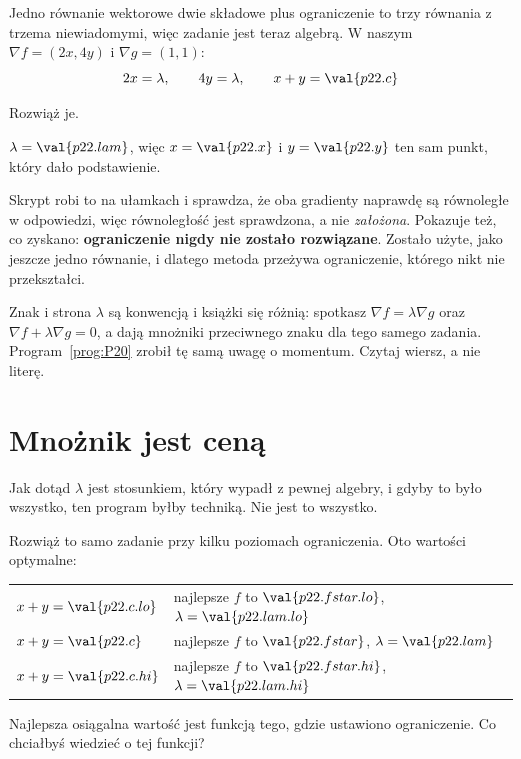 \begin{fr}
Jedno równanie wektorowe \dash{} dwie składowe \dash{} plus ograniczenie to trzy
równania z trzema niewiadomymi, więc zadanie jest teraz algebrą. W naszym
$\nabla f = (2x, 4y)$ i
$\nabla g = (1, 1)$:
\[ 2x = \lambda, \qquad 4y = \lambda, \qquad x + y = \val{p22.c} \]

Rozwiąż je.
\nextframe
\end{fr}

\begin{fr}
\begin{ansblock}
$\lambda = \val{p22.lam}$, więc $x = \val{p22.x}$ i $y = \val{p22.y}$ \dash{}
ten sam punkt, który dało podstawienie.
\end{ansblock}

Skrypt robi to na ułamkach i sprawdza, że oba gradienty naprawdę są równoległe w
odpowiedzi, więc równoległość jest sprawdzona, a nie \emph{założona}. Pokazuje
też, co zyskano: \textbf{ograniczenie nigdy nie zostało
rozwiązane}. Zostało użyte, jako jeszcze jedno równanie, i dlatego metoda
przeżywa ograniczenie, którego nikt nie przekształci.

\begin{note}
Znak i strona $\lambda$ są konwencją i książki się różnią: spotkasz
$\nabla f = \lambda\nabla g$ oraz $\nabla f + \lambda\nabla g = 0$, a dają
mnożniki przeciwnego znaku dla tego samego zadania. Program~\ref{prog:P20}
zrobił tę samą uwagę o momentum. Czytaj wiersz, a nie literę.
\end{note}
\end{fr}

\section{Mnożnik jest ceną}
\label{sec:P22-price}

\begin{fr}
Jak dotąd $\lambda$ jest stosunkiem, który wypadł z pewnej algebry, i gdyby to
było wszystko, ten program byłby techniką. Nie jest to wszystko.

Rozwiąż to samo zadanie przy kilku poziomach ograniczenia. Oto wartości
optymalne:

\begin{center}
\begin{tabular}{ll}
\toprule
$x + y = \val{p22.c.lo}$ & najlepsze $f$ to $\val{p22.fstar.lo}$, $\lambda = \val{p22.lam.lo}$ \\
$x + y = \val{p22.c}$ & najlepsze $f$ to $\val{p22.fstar}$, $\lambda = \val{p22.lam}$ \\
$x + y = \val{p22.c.hi}$ & najlepsze $f$ to $\val{p22.fstar.hi}$, $\lambda = \val{p22.lam.hi}$ \\
\bottomrule
\end{tabular}
\end{center}

Najlepsza osiągalna wartość jest funkcją tego, gdzie ustawiono ograniczenie. Co
chciałbyś wiedzieć o tej funkcji?
\dotline
\nextframe
\end{fr}

